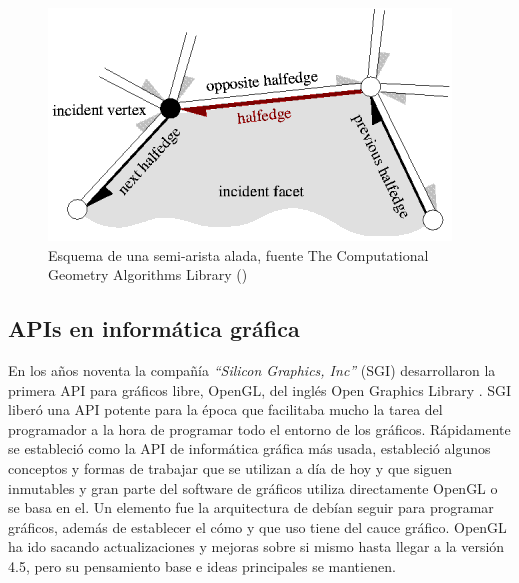 \begin{figure} %
	\centering
	\includegraphics[scale=0.4]{imagenes/halfedge_small.png} 
	\caption{Esquema de una semi-arista alada, fuente The Computational Geometry Algorithms Library (\cite{CGAL12Halfedge})} \label{fig:halfedge_small.png}
\end{figure}

\subsection{APIs en informática gráfica}
En los años noventa la compañía \textit{``Silicon Graphics, Inc''} (SGI) desarrollaron la primera API para gráficos libre, OpenGL, del inglés Open Graphics Library \cite{OpenGLOverview}. SGI liberó una API potente para la época que facilitaba mucho la tarea del programador a la hora de programar todo el entorno de los gráficos. Rápidamente se estableció como la API de informática gráfica más usada, estableció algunos conceptos y formas de trabajar que se utilizan a día de hoy y que siguen inmutables y gran parte del software de gráficos utiliza directamente OpenGL o se basa en el. Un elemento fue la arquitectura de debían seguir para programar gráficos, además de establecer el cómo y que uso tiene del cauce gráfico. OpenGL ha ido sacando actualizaciones y mejoras sobre si mismo hasta llegar a la versión 4.5, pero su pensamiento base e ideas principales se mantienen.\\

